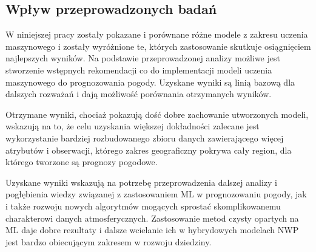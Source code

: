 \subsection{Wpływ przeprowadzonych badań}

W niniejszej pracy zostały pokazane i porównane różne modele z zakresu uczenia
maszynowego i zostały wyróżnione te, których zastosowanie skutkuje 
osiągnięciem najlepszych wyników. Na podstawie przeprowadzonej analizy 
możliwe jest stworzenie wstępnych rekomendacji co do implementacji
modeli uczenia maszynowego do prognozowania pogody. Uzyskane wyniki są linią bazową
dla dalszych rozważań i dają możliwość porównania otrzymanych wyników.

Otrzymane wyniki, chociaż pokazują dość dobre zachowanie utworzonych modeli, wskazują na to,
że celu uzyskania większej dokładności zalecane jest wykorzystanie bardziej 
rozbudowanego zbioru danych zawierającego więcej atrybutów i obserwacji, którego
zakres geograficzny pokrywa cały region, dla którego tworzone są prognozy pogodowe.

Uzyskane wyniki wskazują na potrzebę przeprowadzenia dalszej analizy i pogłębienia
wiedzy związanej z zastosowaniem ML w prognozowaniu pogody, jak i także 
rozwoju nowych algorytmów mogących sprostać skomplikowanemu charakterowi danych 
atmosferycznych. Zastosowanie metod czysty opartych na ML daje dobre rezultaty i 
dalsze wcielanie ich w hybrydowych modelach NWP jest bardzo obiecującym 
zakresem w rozwoju dziedziny.

